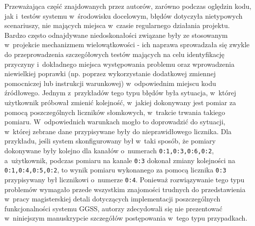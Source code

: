 Przeważająca część znajdowanych przez autorów, zarówno podczas oględzin kodu, jak i~testów systemu w~środowisku docelowym, błędów dotyczyła nietypowych scenariuszy, nie mających miejsca w~czasie regularnego działania projektu. Bardzo często odnajdywane niedoskonałości związane były ze stosowanym w~projekcie mechanizmem wielowątkowości - ich naprawa sprowadzała się zwykle do przeprowadzenia szczegółowych testów mających na celu identyfikację przyczyny i~dokładnego miejsca występowania problemu oraz wprowadzenia niewielkiej poprawki (np. poprzez wykorzystanie dodatkowej zmiennej pomocniczej lub instrukcji warunkowej) w~odpowiednim miejscu kodu źródłowego. Jednym z~przykładów tego typu błędów była sytuacja, w~której użytkownik próbował zmienić kolejność, w~jakiej dokonywany jest pomiar za pomocą poszczególnych liczników słomkowych, w~trakcie trwania takiego pomiaru. W~odpowiednich warunkach mogło to doprowadzić do sytuacji, w~której zebrane dane przypisywane były do nieprawidłowego licznika. Dla przykładu, jeśli system skonfigurowany był w~taki sposób, że pomiary dokonywane były kolejno dla kanałów o~numerach \lstinline{0:1,0:3,0:6,0:2}, a~użytkownik, podczas pomiaru na kanale \lstinline{0:3} dokonał zmiany kolejności na \lstinline{0:1,0:4,0:5,0:2}, to wynik pomiaru wykonanego za pomocą licznika \lstinline{0:3} przypisywany był licznikowi o~numerze \lstinline{0:4}. Ponieważ rozwiązywanie tego typu problemów wymagało przede wszystkim znajomości trudnych do przedstawienia w~pracy magisterskiej detali dotyczących implementacji poszczególnych funkcjonalności systemu GGSS, autorzy zdecydowali się nie prezentować w~niniejszym manuskrypcie szczegółów postępowania w~tego typu przypadkach.

